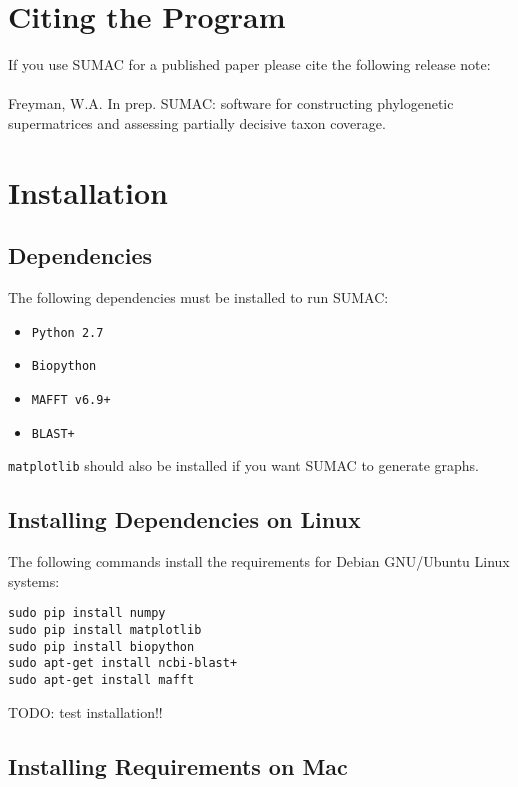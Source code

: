 \documentclass[10pt]{report}
\begin{document}
\section{Citing the Program}

If you use SUMAC for a published paper please cite the following release note: \\
\\
Freyman, W.A. In prep. SUMAC: software for constructing phylogenetic supermatrices and assessing partially decisive taxon coverage.

\section{Installation}

\subsection{Dependencies}

The following dependencies must be installed to run SUMAC:

\begin{itemize}
\item \texttt{Python 2.7}
\item \texttt{Biopython}
\item \texttt{MAFFT v6.9+}
\item \texttt{BLAST+}
\end{itemize}

\texttt{matplotlib} should also be installed if you want SUMAC to generate graphs.

\subsection{Installing Dependencies on Linux}

The following commands install the requirements for Debian GNU/Ubuntu Linux systems:

\begin{verbatim}
sudo pip install numpy
sudo pip install matplotlib
sudo pip install biopython
sudo apt-get install ncbi-blast+
sudo apt-get install mafft
\end{verbatim}

TODO: test installation!!

\subsection{Installing Requirements on Mac}
\end{document}
